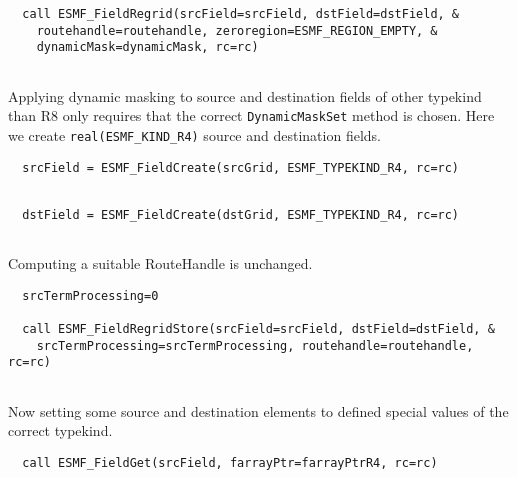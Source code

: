 
 \begin{verbatim}
  call ESMF_FieldRegrid(srcField=srcField, dstField=dstField, &
    routehandle=routehandle, zeroregion=ESMF_REGION_EMPTY, &
    dynamicMask=dynamicMask, rc=rc)
 
\end{verbatim}
 

   Applying dynamic masking to source and destination fields of other typekind
   than R8 only requires that the correct {\tt DynamicMaskSet} method is chosen.
   Here we create {\tt real(ESMF\_KIND\_R4)} source and destination fields. 

 \begin{verbatim}
  srcField = ESMF_FieldCreate(srcGrid, ESMF_TYPEKIND_R4, rc=rc)
 
\end{verbatim}
 

 \begin{verbatim}
  dstField = ESMF_FieldCreate(dstGrid, ESMF_TYPEKIND_R4, rc=rc)
 
\end{verbatim}
 

   Computing a suitable RouteHandle is unchanged. 

 \begin{verbatim}
  srcTermProcessing=0

  call ESMF_FieldRegridStore(srcField=srcField, dstField=dstField, &
    srcTermProcessing=srcTermProcessing, routehandle=routehandle, rc=rc)
 
\end{verbatim}
 

   Now setting some source and destination elements to defined special values
   of the correct typekind. 

 \begin{verbatim}
  call ESMF_FieldGet(srcField, farrayPtr=farrayPtrR4, rc=rc)
 
\end{verbatim}
 
